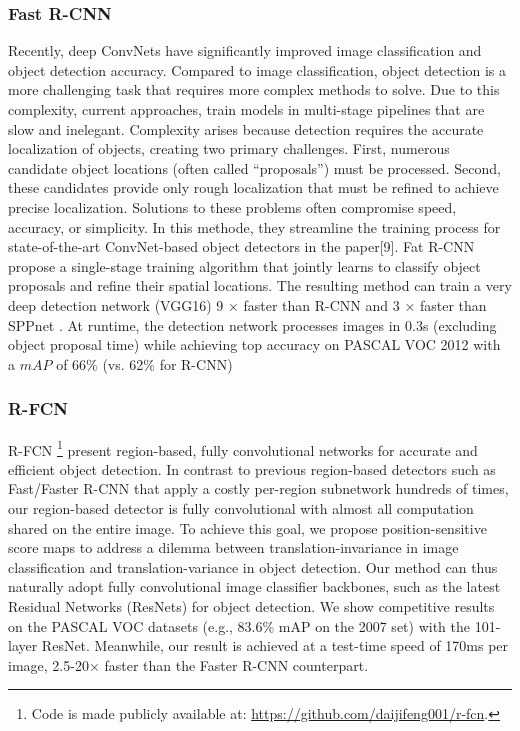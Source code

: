 \documentclass[12pt]{article}
\begin{document}
        \subsubsection{Fast R-CNN}
        Recently, deep ConvNets have significantly improved image classification and object detection
accuracy.  Compared to image classification, object detection  is  a  more  challenging  task  that  requires  more  complex methods to solve.  Due to this complexity, current approaches, train models in multi-stage pipelines that are slow and inelegant. Complexity  arises  because  detection  requires  the  accurate  localization  of  objects,  creating  two  primary  challenges.   First,  numerous  candidate  object  locations  (often called “proposals”) must be processed.  Second, these candidates provide only rough localization that must be refined to achieve precise localization. Solutions to these problems often compromise speed, accuracy, or simplicity.
In this methode, they streamline the training process for state-of-the-art ConvNet-based object detectors in the paper[9].  Fat R-CNN propose a single-stage training algorithm that jointly learns to
classify object proposals and refine their spatial locations.
The  resulting  method  can  train  a  very  deep  detection
network (VGG16) 9 × faster than R-CNN and 3 × faster than SPPnet .  At runtime, the detection network
processes images in 0.3s (excluding object proposal time)
while achieving top accuracy on PASCAL VOC 2012 
with a $mAP$ of 66\% (vs. 62\% for R-CNN)
        
        \subsubsection{ R-FCN }
        
R-FCN \footnote{Code is made publicly available at: \url{ https://github.com/daijifeng001/r-fcn}.} present region-based, fully convolutional networks for accurate and efficient
object detection. In contrast to previous region-based detectors such as Fast/Faster R-CNN that apply a costly per-region subnetwork hundreds of times, our
region-based detector is fully convolutional with almost all computation shared on the entire image. To achieve this goal, we propose position-sensitive score maps to address a dilemma between translation-invariance in image classification and
translation-variance in object detection. Our method can thus naturally adopt fully convolutional image classifier backbones, such as the latest Residual Networks (ResNets) for object detection. We show competitive results on the PASCAL
VOC  datasets  (e.g.,  83.6\%  mAP  on  the  2007  set) with  the  101-layer  ResNet. Meanwhile, our result is achieved at a test-time speed of 170ms per image, 2.5-20× faster than the Faster R-CNN counterpart.         
        
\end{document}
